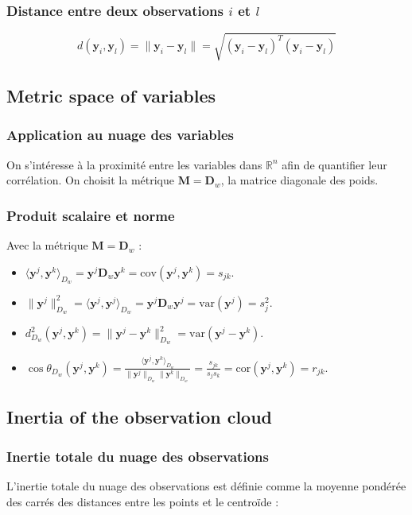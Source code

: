\documentclass[10pt,a4paper]{article}
\begin{document}
\subsubsection*{Distance entre deux observations $i$ et $l$}
\[
d(\mathbf{y}_i, \mathbf{y}_l) = \|\mathbf{y}_i - \mathbf{y}_l\| = \sqrt{(\mathbf{y}_i - \mathbf{y}_l)^T (\mathbf{y}_i - \mathbf{y}_l)}
\]

\subsection*{Metric space of variables}
\subsubsection*{Application au nuage des variables}
On s'intéresse à la proximité entre les variables dans $\mathbb{R}^n$ afin de quantifier leur corrélation. On choisit la métrique $\mathbf{M} = \mathbf{D}_w$, la matrice diagonale des poids.

\subsubsection*{Produit scalaire et norme}
Avec la métrique $\mathbf{M} = \mathbf{D}_w$ :
\begin{itemize}
    \item $\langle \mathbf{y}^j, \mathbf{y}^k \rangle_{D_w} = \mathbf{y}^j \mathbf{D}_w \mathbf{y}^k = \text{cov}(\mathbf{y}^j, \mathbf{y}^k) = s_{jk}$.
    \item $\|\mathbf{y}^j\|_{D_w}^2 = \langle \mathbf{y}^j, \mathbf{y}^j \rangle_{D_w} = \mathbf{y}^j \mathbf{D}_w \mathbf{y}^j = \text{var}(\mathbf{y}^j) = s_j^2$.
    \item $d_{D_w}^2(\mathbf{y}^j, \mathbf{y}^k) = \|\mathbf{y}^j - \mathbf{y}^k\|_{D_w}^2 = \text{var}(\mathbf{y}^j - \mathbf{y}^k)$.
    \item $\cos \theta_{D_w}(\mathbf{y}^j, \mathbf{y}^k) = \frac{\langle \mathbf{y}^j, \mathbf{y}^k \rangle_{D_w}}{\|\mathbf{y}^j\|_{D_w} \|\mathbf{y}^k\|_{D_w}} = \frac{s_{jk}}{s_j s_k} = \text{cor}(\mathbf{y}^j, \mathbf{y}^k) = r_{jk}$.
\end{itemize}

\subsection*{Inertia of the observation cloud}
\subsubsection*{Inertie totale du nuage des observations}
L'inertie totale du nuage des observations est définie comme la moyenne pondérée des carrés des distances entre les points et le centroïde :
\end{document}
